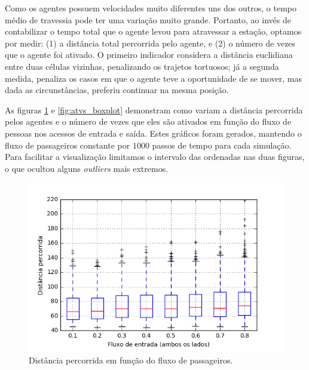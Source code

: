 \documentclass[preprint,12pt]{elsarticle}
\begin{document}
Como os agentes possuem velocidades muito diferentes uns dos outros, o tempo médio de travessia pode ter uma variação muito grande. Portanto, ao invés de contabilizar o tempo total que o agente levou para atravessar a estação, optamos por medir: (1) a distância total percorrida pelo agente, e (2) o número de vezes que o agente foi ativado. O primeiro indicador considera a distância euclidiana entre duas células vizinhas, penalizando os trajetos tortuosos; já a segunda medida, penaliza os casos em que o agente teve a oportunidade de se mover, mas dada as circunstâncias, preferiu continuar na mesma posição.

As figuras \ref{fig:dists_boxplot} e \ref{fig:atvs_boxplot} demonstram como variam a distância percorrida pelos agentes e o número de vezes que eles são ativados em função do fluxo de pessoas nos acessos de entrada e saída. Estes gráficos foram gerados, mantendo o fluxo de passageiros constante por $1000$ passos de tempo para cada simulação. Para facilitar a visualização limitamos o intervalo das ordenadas nas duas figuras, o que ocultou alguns \textit{outliers} mais extremos.

\begin{figure}[H]
	\centering
	\includegraphics[totalheight=7cm]{figures/dist_boxplot.png}
	\caption{Distância percorrida em função do fluxo de passageiros.}
	\label{fig:dists_boxplot}
\end{figure}
\end{document}

